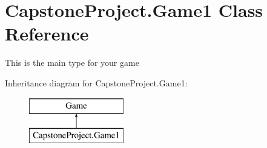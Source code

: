 \hypertarget{class_capstone_project_1_1_game1}{\section{Capstone\-Project.\-Game1 Class Reference}
\label{dd/d3f/class_capstone_project_1_1_game1}
}


This is the main type for your game  


Inheritance diagram for Capstone\-Project.\-Game1\-:\begin{figure}[H]
\begin{center}
\leavevmode
\includegraphics[height=2.000000cm]{dd/d3f/class_capstone_project_1_1_game1}
\end{center}
\end{figure}
